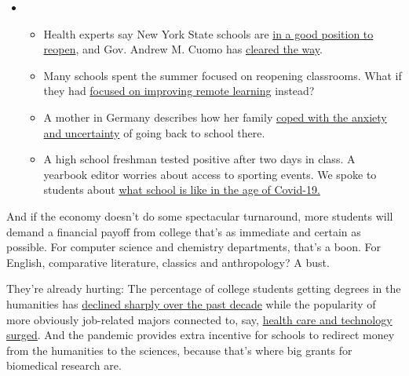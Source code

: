 \begin{itemize}
\item
  \begin{itemize}
  \tightlist
  \item
    Health experts say New York State schools are
    \href{https://www.nytimes.com/2020/08/07/health/coronavirus-ny-schools-reopen.html?action=click\&pgtype=Article\&state=default\&region=MAIN_CONTENT_2\&context=storylines_keepup}{in
    a good position to reopen}, and Gov. Andrew M. Cuomo has
    \href{https://www.nytimes.com/2020/08/07/nyregion/cuomo-schools-reopening.html?action=click\&pgtype=Article\&state=default\&region=MAIN_CONTENT_2\&context=storylines_keepup}{cleared
    the way}.
  \item
    Many schools spent the summer focused on reopening classrooms. What
    if they had
    \href{https://www.nytimes.com/2020/08/07/us/remote-learning-fall-2020.html?action=click\&pgtype=Article\&state=default\&region=MAIN_CONTENT_2\&context=storylines_keepup}{focused
    on improving remote learning} instead?
  \item
    A mother in Germany describes how her family
    \href{https://www.nytimes.com/2020/08/07/parenting/germany-schools-reopening-children.html?action=click\&pgtype=Article\&state=default\&region=MAIN_CONTENT_2\&context=storylines_keepup}{coped
    with the anxiety and uncertainty} of going back to school there.
  \item
    A high school freshman tested positive after two days in class. A
    yearbook editor worries about access to sporting events. We spoke to
    students about
    \href{https://www.nytimes.com/2020/08/06/us/coronavirus-students.html?action=click\&pgtype=Article\&state=default\&region=MAIN_CONTENT_2\&context=storylines_keepup}{what
    school is like in the age of Covid-19.}
  \end{itemize}
\end{itemize}

And if the economy doesn't do some spectacular turnaround, more students
will demand a financial payoff from college that's as immediate and
certain as possible. For computer science and chemistry departments,
that's a boon. For English, comparative literature, classics and
anthropology? A bust.

They're already hurting: The percentage of college students getting
degrees in the humanities has
\href{https://www.theatlantic.com/ideas/archive/2018/08/the-humanities-face-a-crisisof-confidence/567565/}{declined
sharply over the past decade} while the popularity of more obviously
job-related majors connected to, say,
\href{https://www.forbes.com/sites/michaeltnietzel/2019/01/07/whither-the-humanities-the-ten-year-trend-in-college-majors/\#4009403a64ad}{health
care and technology surged}. And the pandemic provides extra incentive
for schools to redirect money from the humanities to the sciences,
because that's where big grants for biomedical research are.

